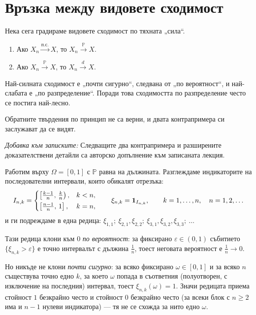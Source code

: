 \section{Връзка между видовете сходимост}

Нека сега градираме видовете сходимост по тяхната „сила“.

\begin{thm}
\begin{enumerate}
    \item[а)] Ако $X_n \xrightarrow{\text{п.с.}} X$, то $X_n \xrightarrow{\mathbb{P}} X$.
    \item[б)] Ако $X_n \xrightarrow{\mathbb{P}} X$, то $X_n \xrightarrow{d} X$.
\end{enumerate}
\end{thm}

Най-силната сходимост е „почти сигурно“, следвана от „по вероятност“, и най-слабата е „по разпределение“. Поради това сходимостта по разпределение често се постига най-лесно.

Обратните твърдения по принцип не са верни, и двата контрапримера си заслужават да се видят.

\emph{Добавка към записките:} Следващите два контрапримера и разширените доказателствени
детайли са авторско допълнение към записаната лекция.

\begin{supp}
\label{ex:10-typewriter}
Работим върху $\Omega = [0,1]$ с $\mathbb{P}$ равна на дължината. Разглеждаме индикаторите на
последователни интервали, които обикалят отрезъка:
\[
I_{n,k} =
\begin{cases}
\left[\frac{k-1}{n},\,\frac{k}{n}\right), & k<n,\\[2pt]
\left[\frac{n-1}{n},\,1\right], & k=n,
\end{cases}
\qquad
\xi_{n,k} = \mathbf{1}_{I_{n,k}},
\qquad k = 1, \dots, n, \quad n = 1, 2, \dots
\]
и ги подреждаме в една редица: $\xi_{1,1};\ \xi_{2,1}, \xi_{2,2};\ \xi_{3,1}, \xi_{3,2}, \xi_{3,3};\ \dots$

Тази редица клони към $0$ \emph{по вероятност}: за фиксирано $\varepsilon \in (0,1)$
събитието $\{\xi_{n,k} > \varepsilon\}$ е точно интервалът с дължина $\frac1n$, тоест
неговата вероятност е $\frac1n \to 0$.

Но никъде не клони \emph{почти сигурно}: за всяко фиксирано $\omega \in [0,1]$ и за всяко
$n$ съществува точно едно $k$, за което $\omega$ попада в съответния (полуотворен,
с изключение на последния) интервал, тоест
$\xi_{n,k}(\omega) = 1$. Значи редицата приема стойност $1$ безкрайно често и стойност $0$
безкрайно често (за всеки блок с $n\ge 2$ има и $n-1$ нулеви индикатора) — тя не се схожда
за нито едно $\omega$.
\end{supp}

